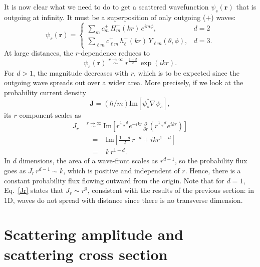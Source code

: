\documentclass[pra,12pt]{revtex4}
\begin{document}
It is now clear what we need to do to get a scattered wavefunction
$\psi_s(\mathbf{r})$ that is outgoing at infinity.  It must be a
superposition of only outgoing ($+$) waves:
\begin{equation}
  \psi_s(\mathbf{r}) = \begin{cases} \displaystyle\sum_{m} c_m^+\,H_m^+(kr)\,e^{im\phi}, &d=2\\ \displaystyle\sum_{\ell m} c_{\ell m}^+\,h_\ell^+(kr)\,Y_{\ell m}(\theta,\phi),&d=3.\end{cases}
\end{equation}
At large distances, the $r$-dependence reduces to
\begin{equation}
  \psi_s(\mathbf{r}) \; \overset{r\rightarrow\infty}{\sim} \; r^{\frac{1-d}{2}} \,\exp\left(ikr\right).
\end{equation}
For $d > 1$, the magnitude decreases with $r$, which is to be expected
since the outgoing wave spreads out over a wider area.  More
precisely, if we look at the probability current density
\begin{equation*}
  \mathbf{J} = (\hbar/m) \mathrm{Im}\left[\psi_s^*\nabla\psi_s\right],  
\end{equation*}
its $r$-component scales as
\begin{equation}
  \begin{aligned}J_r \; &\overset{r\rightarrow\infty}{\sim} \; \mathrm{Im}\left[r^{\frac{1-d}{2}} e^{-ikr} \frac{\partial}{\partial r}\left(r^{\frac{1-d}{2}} e^{ikr}\right)\right] \\ &\;\;=\;\;\;\mathrm{Im}\left[\frac{1-d}{2}\, r^{-d} + ik r^{1-d}\right]\\ &\;\;=\;\;\; k \,r^{1-d}.\end{aligned}
  \label{Jr}
\end{equation}
In $d$ dimensions, the area of a wave-front scales as $r^{d-1}$, so
the probability flux goes as $J_r \,r^{d-1} \sim k$, which is positive
and independent of $r$.  Hence, there is a constant probability flux
flowing outward from the origin.  Note that for $d=1$, Eq.~\eqref{Jr}
states that $J_r \sim r^0$, consistent with the results of the
previous section: in 1D, waves do not spread with distance since there
is no transverse dimension.

\section{Scattering amplitude and scattering cross section}
\label{sec:scattering_amplitude}
\end{document}
